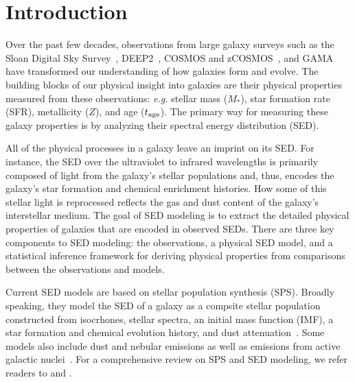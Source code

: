\section{Introduction} \label{sec:intro} 
Over the past few decades, observations from large galaxy surveys such as the
Sloan Digital Sky Survey~\citep[SDSS;][]{york2000}, DEEP2~\citep{davis2003},
COSMOS and zCOSMOS~\citep{scoville2007, lilly2007}, and GAMA~\citep{baldry2018}
have transformed our understanding of how galaxies form and evolve. 
The building blocks of our physical insight into galaxies are their 
physical properties measured from these observations: \emph{e.g.} stellar mass ($M_*$), star formation rate
(SFR), metallicity ($Z$), and age ($t_{\rm age}$).
The primary way for measuring these galaxy properties is by analyzing their
spectral energy distribution (SED).

All of the physical processes in a galaxy leave an imprint on its SED.
For instance, the SED over the ultraviolet to infrared wavelengths is
primarily composed of light from the galaxy's stellar populations and, thus,
encodes the galaxy's star formation and chemical enrichment histories.  
How some of this stellar light is reprocessed reflects the gas and dust content
of the galaxy's interstellar medium.
The goal of SED modeling is to extract the detailed physical properties of
galaxies that are encoded in observed SEDs. 
There are three key components to SED modeling: the observations, a physical SED
model, and a statistical inference framework for deriving physical properties 
from comparisons between the observations and models.

Current SED models are based on stellar population synthesis (SPS).
Broadly speaking, they model the SED of a galaxy as a compsite stellar
population constructed from isocrhones, stellar spectra, an initial mass
function (IMF), a star formation and chemical evolution history, and dust
attenuation~\citep[\emph{e.g.}][]{bruzual2003, maraston2005, conroy2009}.
Some models also include dust and nebular emissions as well as emissions from
active galactic nuclei~\citep[\emph{e.g.}][]{johnson2021}.
For a comprehensive review on SPS and SED modeling, we refer readers to
\cite{walcher2011} and \cite{conroy2013}. 

